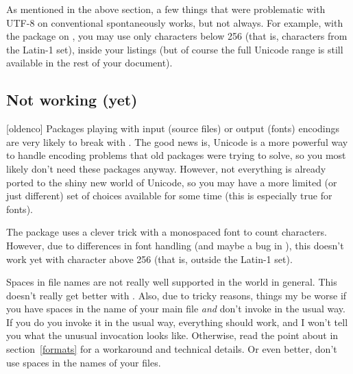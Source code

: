 \documentclass{lltxdoc}
\begin{document}
As mentioned in the above section, a few things that were problematic with
UTF-8 on conventional \latex spontaneously works, but not always. For example,
with the  package on \lualatex, you may use only characters below
256 (that is, characters from the Latin-1 set), inside your listings (but of
course the full Unicode range is still available in the rest of your
document).

\subsection{Not working (yet)}\label{notworking}

[oldenco] Packages playing with input (source files) or
output (fonts) encodings are very likely to break with \luatex. The good news
is, Unicode is a more powerful way to handle encoding problems that old
packages were trying to solve, so you most likely don't need these packages
anyway. However, not everything is already ported to the shiny new world of
Unicode, so you may have a more limited (or just different) set of choices
available for some time (this is especially true for fonts).

 The  package uses a clever trick with a monospaced font
to count characters. However, due to differences in font handling (and maybe a
bug in \luatex), this doesn't work yet with character above 256 (that is,
outside the Latin-1 set).

 Spaces in file names are not really well supported in the \tex
world in general. This doesn't really get better with \luatex. Also, due to
tricky reasons, things my be worse if you have spaces in the name of your main
\tex file \emph{and} don't invoke \luatex in the usual way. If you do you
invoke it in the usual way, everything should work, and I won't tell you what
the unusual invocation looks like. Otherwise, read the point about
 in section~\ref{formats} for a workaround and technical
details. Or even better, don't use spaces in the names of your \tex files.
\end{document}
